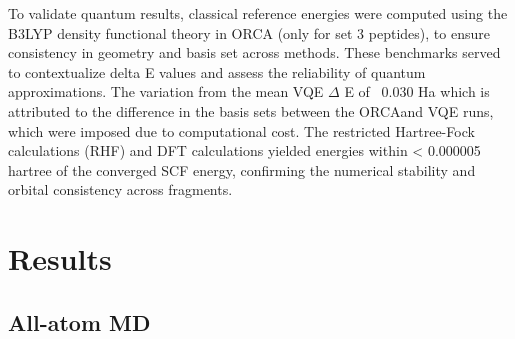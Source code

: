 \documentclass[pdflatex,sn-mathphys-num]{sn-jnl}%
\theoremstyle{thmstyleone}%
\theoremstyle{thmstyletwo}%
\theoremstyle{thmstylethree}%
\begin{document}
To validate quantum results, classical reference energies were computed using the B3LYP\cite{b3lyp} density functional theory in ORCA\cite{orca2020} (only for set 3 peptides), to ensure consistency in geometry and basis set across methods. These benchmarks served to contextualize delta E values and assess the reliability of quantum approximations. The variation from the mean VQE $\Delta$ E of ~0.030 Ha which is attributed to the difference in the basis sets between the ORCA\cite{orca2020}and VQE\cite{peruzzo2014} runs, which were imposed due to computational cost. The restricted Hartree-Fock calculations (RHF) and DFT calculations yielded energies within < 0.000005 hartree of the converged SCF energy, confirming the numerical stability and orbital consistency across fragments.
\section{Results}\label{sec2}

\subsection{\textbf{All-atom MD}}
\end{document}
